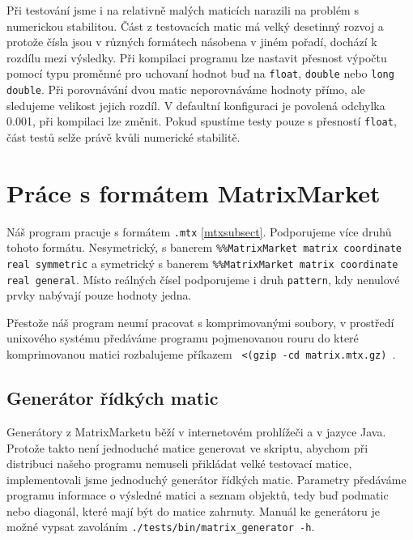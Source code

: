 Při testování jsme i na relativně malých maticích narazili na problém s numerickou stabilitou. Část z testovacích matic má velký desetinný rozvoj a protože čísla jsou v různých formátech násobena v jiném pořadí, dochází k rozdílu mezi výsledky. Při kompilaci programu lze nastavit přesnost výpočtu pomocí typu proměnné pro uchovaní hodnot buď na \texttt{float}, \texttt{double} nebo \texttt{long double}. Při porovnávání dvou matic neporovnáváme hodnoty přímo, ale sledujeme velikost jejich rozdíl. V defaultní konfiguraci je povolená odchylka 0.001, při kompilaci lze změnit. Pokud spustíme testy  pouze s přesností \texttt{float}, část testů selže právě kvůli numerické stabilitě. 


\section{Práce s formátem MatrixMarket}
\label{MM}

Náš program pracuje s formátem \texttt{.mtx} \ref{mtxsubsect}. Podporujeme více druhů tohoto formátu. Nesymetrický, s banerem \texttt{\%\%MatrixMarket matrix coordinate real symmetric} a symetrický s banerem \texttt{\%\%MatrixMarket matrix coordinate real general}. Místo reálných čísel podporujeme i druh \texttt{pattern}, kdy nenulové prvky nabývají pouze hodnoty jedna.

Přestože náš program neumí pracovat s komprimovanými soubory, v prostředí unixového systému předáváme programu pojmenovanou rouru do které komprimovanou matici rozbalujeme příkazem \texttt{ <(gzip -cd matrix.mtx.gz) }.

\subsection{Generátor řídkých matic}

Generátory z MatrixMarketu běží v internetovém prohlížeči a v jazyce Java. Protože takto není jednoduché matice generovat ve skriptu, abychom při distribuci našeho programu nemuseli přikládat velké testovací matice, implementovali jsme jednoduchý generátor řídkých matic. Parametry předáváme programu informace o výsledné matici a seznam objektů, tedy buď podmatic nebo diagonál, které mají být do matice zahrnuty. Manuál ke generátoru je možné vypsat zavoláním \texttt{./tests/bin/matrix\_generator -h}.    

